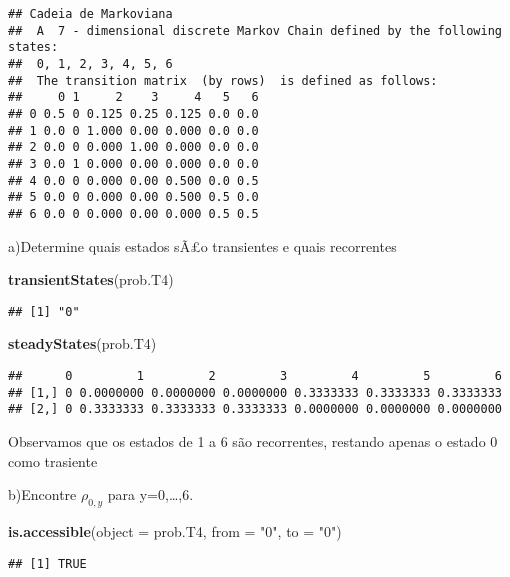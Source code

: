 \documentclass[
]{article}
\newenvironment{Shaded}{\begin{snugshade}}{\end{snugshade}}
\newcommand{\DataTypeTok}[1]{\textcolor[rgb]{0.13,0.29,0.53}{#1}}
\newcommand{\KeywordTok}[1]{\textcolor[rgb]{0.13,0.29,0.53}{\textbf{#1}}}
\newcommand{\NormalTok}[1]{#1}
\newcommand{\StringTok}[1]{\textcolor[rgb]{0.31,0.60,0.02}{#1}}
\begin{document}
\begin{verbatim}
## Cadeia de Markoviana 
##  A  7 - dimensional discrete Markov Chain defined by the following states: 
##  0, 1, 2, 3, 4, 5, 6 
##  The transition matrix  (by rows)  is defined as follows: 
##     0 1     2    3     4   5   6
## 0 0.5 0 0.125 0.25 0.125 0.0 0.0
## 1 0.0 0 1.000 0.00 0.000 0.0 0.0
## 2 0.0 0 0.000 1.00 0.000 0.0 0.0
## 3 0.0 1 0.000 0.00 0.000 0.0 0.0
## 4 0.0 0 0.000 0.00 0.500 0.0 0.5
## 5 0.0 0 0.000 0.00 0.500 0.5 0.0
## 6 0.0 0 0.000 0.00 0.000 0.5 0.5
\end{verbatim}

a)Determine quais estados sÃ£o transientes e quais recorrentes

\begin{Shaded}
\begin{Highlighting}[]
\KeywordTok{transientStates}\NormalTok{(prob.T4)}
\end{Highlighting}
\end{Shaded}

\begin{verbatim}
## [1] "0"
\end{verbatim}

\begin{Shaded}
\begin{Highlighting}[]
\KeywordTok{steadyStates}\NormalTok{(prob.T4)}
\end{Highlighting}
\end{Shaded}

\begin{verbatim}
##      0         1         2         3         4         5         6
## [1,] 0 0.0000000 0.0000000 0.0000000 0.3333333 0.3333333 0.3333333
## [2,] 0 0.3333333 0.3333333 0.3333333 0.0000000 0.0000000 0.0000000
\end{verbatim}

Observamos que os estados de 1 a 6 são recorrentes, restando apenas o
estado 0 como trasiente

b)Encontre \(\rho_{0,y}\) para y=0,\ldots,6.

\begin{Shaded}
\begin{Highlighting}[]
\KeywordTok{is.accessible}\NormalTok{(}\DataTypeTok{object =}\NormalTok{ prob.T4, }\DataTypeTok{from =} \StringTok{"0"}\NormalTok{, }\DataTypeTok{to =} \StringTok{"0"}\NormalTok{)}
\end{Highlighting}
\end{Shaded}

\begin{verbatim}
## [1] TRUE
\end{verbatim}
\end{document}
